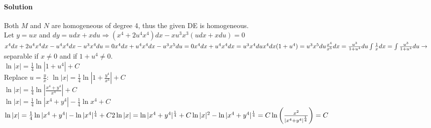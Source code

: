 \documentclass{article}
\begin{document}
\paragraph{Solution} Both $M$ and $N$ are homogeneous of degree 4, thus the given DE is homogeneous.
\\Let $y=ux$ and $dy=udx+xdu\Rightarrow(x^4+2u^4x^4)dx-xu^3x^3(udx+xdu)=0$
\\$x^4dx+2u^4x^4dx-u^4x^4dx-u^3x^4du=0
\\x^4dx+u^4x^4dx-u^3x^5du=0
\\x^4dx+u^4x^4dx=u^3x^4du
\\x^4dx(1+u^4)=u^3x^5du
\\\frac{x^4}{x^5}dx=\frac{u^3}{1+u^4}du
\\\int\frac{1}{x}dx=\int\frac{u^3}{1+u^4}du\to$separable if $x\neq0$ and if $1+u^4\neq0$.
\\$\ln|x|=\frac{1}{4}\ln|1+u^4|+C$
\\Replace $u=\frac{y}{x}$: $\ln|x|=\frac{1}{4}\ln|1+\frac{y^4}{x^4}|+C$
\\$\ln|x|=\frac{1}{4}\ln\left|\frac{x^4+y^4}{x^4}\right|+C$
\\$\ln|x|=\frac{1}{4}\ln|x^4+y^4|-\frac{1}{4}\ln{x^4}+C$
\\$\ln|x|=\frac{1}{4}\ln|x^4+y^4|-\ln|x^4|^{\frac{1}{4}}+C
\\2\ln|x|=\ln|x^4+y^4|^{\frac{1}{4}}+C
\\\ln|x|^2-\ln|x^4+y^4|^{\frac{1}{4}}=C
\\\ln\left(\frac{x^2}{|x^4+y^4|^{\frac{1}{4}}}\right)=C$

\newpage
\end{document}
